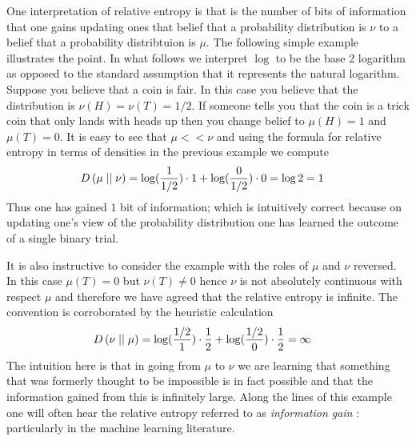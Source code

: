 \begin{examp}One interpretation of relative entropy is that is the
  number of bits of information that one gains updating ones that
  belief that a probability distribution is $\nu$ to a belief that a
  probability distribtuion is $\mu$.  The following simple example
  illustrates the point.  In what follows we interpret $\log$ to be
  the base 2 logarithm as opposed to the standard assumption that it
  represents the natural logarithm.  Suppose you believe that a coin is fair.  In
  this case you believe that the distribution is $\nu(H) = \nu(T) =
  1/2$.  If someone tells you that the coin is a trick coin that only
  lands with heads up then you change belief to $\mu(H) = 1$ and
  $\mu(T)=0$.  It is easy to see that $\mu <<  \nu$ and using the formula for relative entropy in terms of
  densities in the previous example we compute
\begin{align*}
D\left( \mu \mid\mid \nu \right) &= \log(\frac{1}{1/2}) \cdot 1 + \log
(\frac{0}{1/2}) \cdot 0 = \log 2 = 1
\end{align*}
Thus one has gained $1$ bit of information; which is intuitively
correct because on updating one's view of the probability distribution
one has learned the outcome of a single binary trial.

It is also instructive to consider the example with the roles of $\mu$
and $\nu$ reversed.  In this case $\mu(T) = 0$ but $\nu(T) \neq 0$
hence $\nu$ is not absolutely continuous with respect $\mu$ and
therefore we have agreed that the relative entropy is infinite.  The convention
is corroborated by the heuristic calculation
\begin{align*}
D\left( \nu \mid\mid \mu \right) &= \log(\frac{1/2}{1}) \cdot \frac{1}{2} + \log
(\frac{1/2}{0}) \cdot \frac{1}{2} = \infty
\end{align*}
The intuition here is that in going from $\mu$ to $\nu$ we are
learning that something that was formerly thought to be impossible is
in fact possible and that the information gained from this is
infinitely large.  Along the lines of this example one will often hear
the relative entropy referred to as \emph{information gain} :
particularly in the machine learning literature.
\end{examp}

